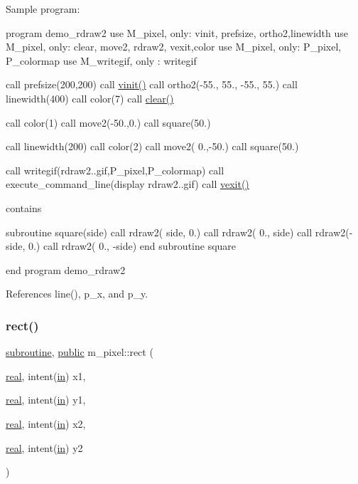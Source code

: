 Sample program\+:

program demo\+\_\+rdraw2 use M\+\_\+pixel, only\+: vinit, prefsize, ortho2,linewidth use M\+\_\+pixel, only\+: clear, move2, rdraw2, vexit,color use M\+\_\+pixel, only\+: P\+\_\+pixel, P\+\_\+colormap use M\+\_\+writegif, only \+: writegif

call prefsize(200,200) call \hyperlink{namespacem__pixel_ac03ca8f23fdadb60599b6ea4dc87a6d9}{vinit()} call ortho2(-\/55., 55., -\/55., 55.) call linewidth(400) call color(7) call \hyperlink{namespacem__pixel_af3b81a21a0b2f6b5eddd09c031bd6173}{clear()}

call color(1) call move2(-\/50.,0.) call square(50.)

call linewidth(200) call color(2) call move2( 0.,-\/50.) call square(50.)

call writegif(\textquotesingle{}rdraw2..\+gif\textquotesingle{},P\+\_\+pixel,P\+\_\+colormap) call execute\+\_\+command\+\_\+line(\textquotesingle{}display rdraw2..\+gif\textquotesingle{}) call \hyperlink{namespacem__pixel_a19ad6b65752322b0029a62cc0ebec3e8}{vexit()}

contains

subroutine square(side) call rdraw2( side, 0.) call rdraw2( 0., side) call rdraw2(-\/side, 0.) call rdraw2( 0., -\/side) end subroutine square

end program demo\+\_\+rdraw2 

References line(), p\+\_\+x, and p\+\_\+y.

\mbox{\label{namespacem__pixel_a5435aa0d9d6048a62c09d7d90665b958}} 
\subsubsection{\texorpdfstring{rect()}{rect()}}
{\footnotesize\ttfamily \hyperlink{M__stopwatch_83_8txt_acfbcff50169d691ff02d4a123ed70482}{subroutine}, \hyperlink{M__stopwatch_83_8txt_a2f74811300c361e53b430611a7d1769f}{public} m\+\_\+pixel\+::rect (\begin{DoxyParamCaption}\item[{\hyperlink{read__watch_83_8txt_abdb62bde002f38ef75f810d3a905a823}{real}, intent(\hyperlink{M__journal_83_8txt_afce72651d1eed785a2132bee863b2f38}{in})}]{x1,  }\item[{\hyperlink{read__watch_83_8txt_abdb62bde002f38ef75f810d3a905a823}{real}, intent(\hyperlink{M__journal_83_8txt_afce72651d1eed785a2132bee863b2f38}{in})}]{y1,  }\item[{\hyperlink{read__watch_83_8txt_abdb62bde002f38ef75f810d3a905a823}{real}, intent(\hyperlink{M__journal_83_8txt_afce72651d1eed785a2132bee863b2f38}{in})}]{x2,  }\item[{\hyperlink{read__watch_83_8txt_abdb62bde002f38ef75f810d3a905a823}{real}, intent(\hyperlink{M__journal_83_8txt_afce72651d1eed785a2132bee863b2f38}{in})}]{y2 }\end{DoxyParamCaption})}




